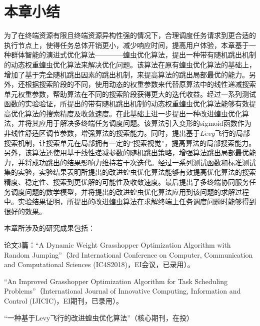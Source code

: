 \section{本章小结}\label{sec:task_scheduling_summary}

为了在终端资源有限且终端资源异构性强的情况下，合理调度任务请求到更合适的执行节点上，使得任务总体开销更小，减少响应时间，提高用户体验，本章基于一种群体智能的演进式优化算法————蝗虫优化算法，提出一种带有随机跳出机制的动态权重蝗虫优化算法来解决优化问题。该算法在原有蝗虫优化算法的基础上，增加了基于完全随机跳出因素的跳出机制，来提高算法的跳出局部最优的能力。另外，还根据搜索阶段的不同，使用动态的权重参数来代替原算法中的线性递减搜索单元权重参数，帮助算法在不同的搜索阶段获得更大的迭代收益。经过一系列测试函数的实验验证，所提出的带有随机跳出机制的动态权重蝗虫优化算法能够有效提高优化算法的搜索精度及收敛速度。在此基础上进一步提出一种改进蝗虫优化算法，并将其应用于解决多终端任务调度问题。该算法引入变形的sigmoid函数作为非线性舒适区调节参数，增强算法的搜索能力。同时，提出基于$L\acute{e}vy$飞行的局部搜索机制，让搜索单元在局部拥有一定的“搜索视觉”，提高算法的局部搜索能力。另外，该算法还使用基于线性递减参数的随机跳出策略，增强算法跳出局部最优能力，并将成功跳出的结果影响力维持若干次迭代。经过一系列测试函数和标准测试集的实验，实验结果表明所提出的改进蝗虫优化算法能够有效提高优化算法的搜索精度、稳定性、搜索到更优解的可能性及收敛速度。最后提出了多终端协同服务任务调度问题的数学模型，并将提出的改进蝗虫优化算法应用到该问题的求解过程中。实验结果证明，所提出的改进蝗虫算法在求解终端上任务调度问题时能够得到很好的效果。

本章所涉及的研究成果包括：

论文3篇：“A Dynamic Weight Grasshopper Optimization Algorithm with Random Jumping”（3rd International Conference on Computer, Communication and Computational Sciences (IC4S2018)，EI会议，已录用）。

“An Improved Grasshopper Optimization Algorithm for Task Scheduling Problems”（International Journal of Innovative Computing, Information and Control (IJICIC)，EI期刊，已录用）。


“一种基于Levy飞行的改进蝗虫优化算法”（核心期刊，在投）